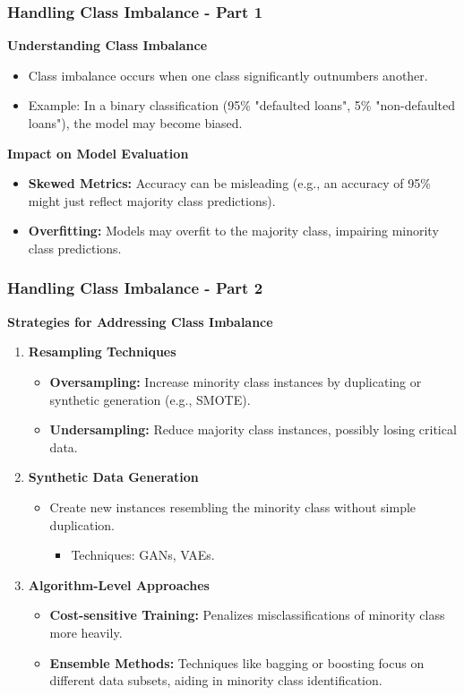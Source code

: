 \documentclass[aspectratio=169]{beamer}
\begin{document}
\begin{frame}[fragile]
    \frametitle{Handling Class Imbalance - Part 1}
    \textbf{Understanding Class Imbalance}
    \begin{itemize}
        \item Class imbalance occurs when one class significantly outnumbers another.
        \item Example: In a binary classification (95\% "defaulted loans", 5\% "non-defaulted loans"), the model may become biased.
    \end{itemize}
    
    \textbf{Impact on Model Evaluation}
    \begin{itemize}
        \item \textbf{Skewed Metrics:} Accuracy can be misleading (e.g., an accuracy of 95\% might just reflect majority class predictions).
        \item \textbf{Overfitting:} Models may overfit to the majority class, impairing minority class predictions.
    \end{itemize}
\end{frame}

\begin{frame}[fragile]
    \frametitle{Handling Class Imbalance - Part 2}
    \textbf{Strategies for Addressing Class Imbalance}
    
    \begin{enumerate}
        \item \textbf{Resampling Techniques}
        \begin{itemize}
            \item \textbf{Oversampling:} Increase minority class instances by duplicating or synthetic generation (e.g., SMOTE).
            \item \textbf{Undersampling:} Reduce majority class instances, possibly losing critical data.
        \end{itemize}
        
        \item \textbf{Synthetic Data Generation}
        \begin{itemize}
            \item Create new instances resembling the minority class without simple duplication.
            \begin{itemize}
                \item Techniques: GANs, VAEs.
            \end{itemize}
        \end{itemize}
        
        \item \textbf{Algorithm-Level Approaches}
        \begin{itemize}
            \item \textbf{Cost-sensitive Training:} Penalizes misclassifications of minority class more heavily.
            \item \textbf{Ensemble Methods:} Techniques like bagging or boosting focus on different data subsets, aiding in minority class identification.
        \end{itemize}
    \end{enumerate}    
\end{frame}
\end{document}
